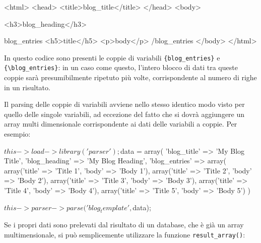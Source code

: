 \begin{html}
<html>
<head>
<title>{blog_title}</title>
</head>
<body>

<h3>{blog_heading}</h3>

{blog_entries}
<h5>{title}</h5>
<p>{body}</p>
{/blog_entries}
</body>
</html>
\end{html}

In questo codice sono presenti le coppie di variabili \verb|{blog_entries}| e \verb|{\blog_entries}|: in un caso come questo, l'intero blocco di dati tra queste coppie sarà presumibilmente ripetuto più volte, corrispondente al numero di righe in un risultato. 

Il parsing delle coppie di variabili avviene nello stesso identico modo visto per quello delle singole variabili, ad eccezione del fatto che si dovrà aggiungere un array multi dimensionale corrispondente ai dati delle variabili a coppie. Per esempio:

\begin{code}
$this->load->library('parser');

$data = array(
  'blog_title'   => 'My Blog Title',
  'blog_heading' => 'My Blog Heading',
  'blog_entries' => array(
                          array('title' => 'Title 1', 'body' => 'Body 1'),
                          array('title' => 'Title 2', 'body' => 'Body 2'),
                          array('title' => 'Title 3', 'body' => 'Body 3'),
                          array('title' => 'Title 4', 'body' => 'Body 4'),
                          array('title' => 'Title 5', 'body' => 'Body 5')
                          )
  

$this->parser->parse('blog_template', $data);
\end{code}

Se i propri dati sono prelevati dal risultato di un database, che è già un array multimensionale, si può semplicemente utilizzare la funzione \verb|result_array()|:

